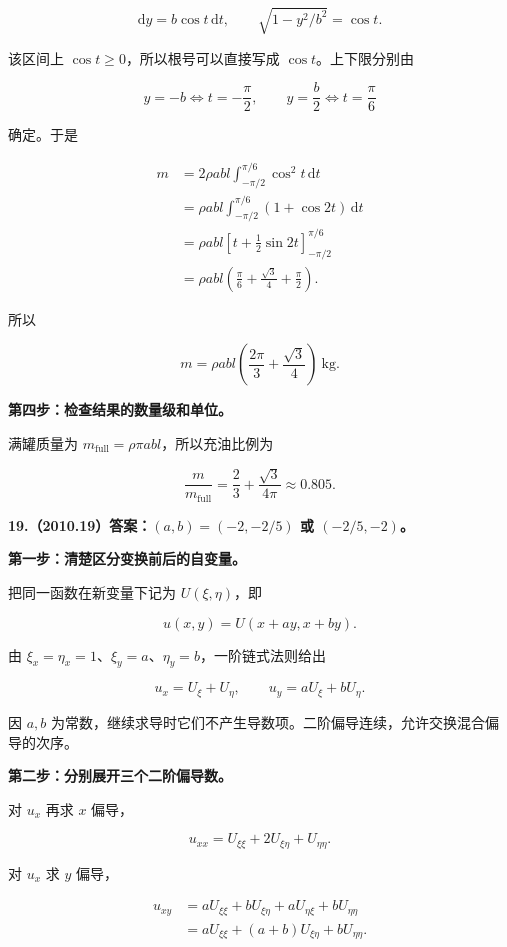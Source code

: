 \documentclass[UTF8,11pt,fontset=windows]{ctexart}
\begin{document}
$$
\mathrm dy=b\cos t\,\mathrm dt,
\qquad\sqrt{1-y^2/b^2}=\cos t.
$$

该区间上 $\cos t\ge0$，所以根号可以直接写成 $\cos t$。上下限分别由

$$
y=-b\Longleftrightarrow t=-\frac\pi2,
\qquad y=\frac b2\Longleftrightarrow t=\frac\pi6
$$

确定。于是

$$
\begin{aligned}
m
&=2\rho abl\int_{-\pi/2}^{\pi/6}\cos^2t\,\mathrm dt\\
&=\rho abl\int_{-\pi/2}^{\pi/6}(1+\cos2t)\,\mathrm dt\\
&=\rho abl\left[t+\frac12\sin2t\right]_{-\pi/2}^{\pi/6}\\
&=\rho abl\left(\frac\pi6+\frac{\sqrt3}{4}+\frac\pi2\right).
\end{aligned}
$$

所以

$$
\boxed{m=\rho abl\left(\frac{2\pi}{3}+\frac{\sqrt3}{4}\right)\ \mathrm{kg}}.
$$

\textbf{第四步：检查结果的数量级和单位。}

满罐质量为 $m_{\mathrm{full}}=\rho\pi abl$，所以充油比例为

$$
\frac{m}{m_{\mathrm{full}}}
=\frac23+\frac{\sqrt3}{4\pi}\approx0.805.
$$

\clearpage

\textbf{19.（2010.19）答案：$(a,b)=(-2,-2/5)$ 或 $(-2/5,-2)$。}

\textbf{第一步：清楚区分变换前后的自变量。}

把同一函数在新变量下记为 $U(\xi,\eta)$，即

$$
u(x,y)=U(x+ay,x+by).
$$

由 $\xi_x=\eta_x=1$、$\xi_y=a$、$\eta_y=b$，一阶链式法则给出

$$
u_x=U_\xi+U_\eta,
\qquad u_y=aU_\xi+bU_\eta.
$$

因 $a,b$ 为常数，继续求导时它们不产生导数项。二阶偏导连续，允许交换混合偏导的次序。

\textbf{第二步：分别展开三个二阶偏导数。}

对 $u_x$ 再求 $x$ 偏导，

$$
u_{xx}=U_{\xi\xi}+2U_{\xi\eta}+U_{\eta\eta}.
$$

对 $u_x$ 求 $y$ 偏导，

$$
\begin{aligned}
u_{xy}
&=aU_{\xi\xi}+bU_{\xi\eta}
+aU_{\eta\xi}+bU_{\eta\eta}\\
&=aU_{\xi\xi}+(a+b)U_{\xi\eta}+bU_{\eta\eta}.
\end{aligned}
$$
\end{document}
